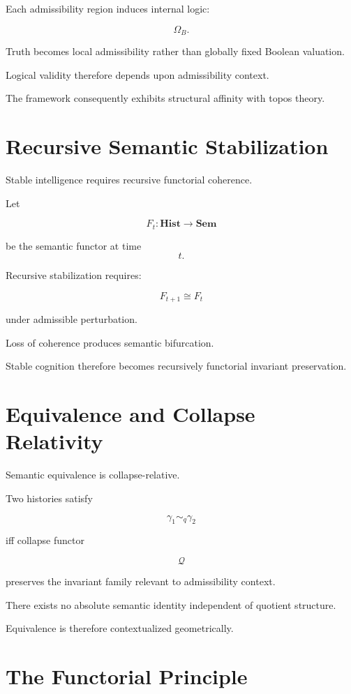 \documentclass[12pt,openany]{book}
\theoremstyle{plain}
\theoremstyle{definition}
\theoremstyle{remark}
\begin{document}
Each admissibility region induces internal logic:

\[
\Omega_B.
\]

Truth becomes local admissibility rather than globally fixed
Boolean valuation.

Logical validity therefore depends upon admissibility context.

The framework consequently exhibits structural affinity with
topos theory.

\section{Recursive Semantic Stabilization}

Stable intelligence requires recursive functorial coherence.

Let

\[
F_t :
\mathbf{Hist}
\to
\mathbf{Sem}
\]

be the semantic functor at time
\[
t.
\]

Recursive stabilization requires:

\[
F_{t+1}
\cong
F_t
\]

under admissible perturbation.

Loss of coherence produces semantic bifurcation.

Stable cognition therefore becomes recursively functorial
invariant preservation.

\section{Equivalence and Collapse Relativity}

Semantic equivalence is collapse-relative.

Two histories satisfy

\[
\gamma_1 \sim_q \gamma_2
\]

iff collapse functor

\[
\mathcal{Q}
\]

preserves the invariant family relevant to admissibility context.

There exists no absolute semantic identity independent of
quotient structure.

Equivalence is therefore contextualized geometrically.

\section{The Functorial Principle}
\end{document}
